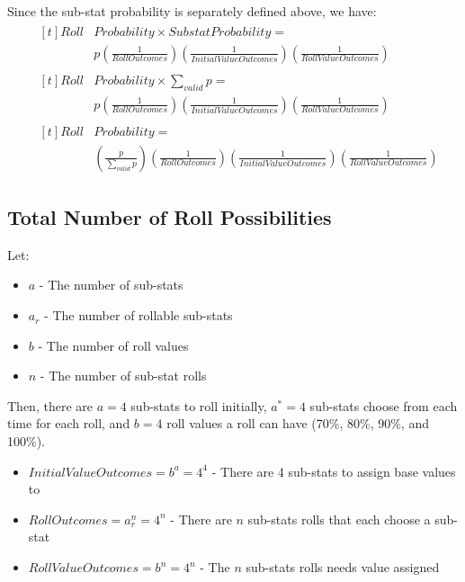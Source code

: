 \documentclass[12pt]{article}
\begin{document}
Since the sub-stat probability is separately defined above, we have:
\begin{align*}
	&\begin{aligned}[t]Roll&Probability \times SubstatProbability = \\
	&p\left(\frac{1}{RollOutcomes}\right)\left(\frac{1}{InitialValueOutcomes}\right)\left(\frac{1}{RollValueOutcomes}\right)\end{aligned} \\[12pt]
	&\begin{aligned}[t]Roll&Probability \times \sum_{valid} p = \\
	&p\left(\frac{1}{RollOutcomes}\right)\left(\frac{1}{InitialValueOutcomes}\right)\left(\frac{1}{RollValueOutcomes}\right)\end{aligned} \\[12pt]
	&\begin{aligned}[t]Roll&Probability = \\
	&\left(\frac{p}{\sum_{valid} p}\right)\left(\frac{1}{RollOutcomes}\right)\left(\frac{1}{InitialValueOutcomes}\right)\left(\frac{1}{RollValueOutcomes}\right)\end{aligned}
\end{align*}

\subsection{Total Number of Roll Possibilities}

Let:
\begin{itemize}[]
	\item $a$ - The number of sub-stats
	\item $a_{r}$ - The number of rollable sub-stats
	\item $b$ - The number of roll values
	\item $n$ - The number of sub-stat rolls
\end{itemize}

Then, there are $a = 4$ sub-stats to roll initially, $a^* = 4$ sub-stats choose from each time for each roll, and $b = 4$ roll values a roll can have (70\%, 80\%, 90\%, and 100\%).
\begin{itemize}[]
	\item $InitialValueOutcomes = b^a = 4^4$ - There are 4 sub-stats to assign base values to
	\item $RollOutcomes = a_{r}^n = 4^n$ - There are $n$ sub-stats rolls that each choose a sub-stat
	\item $RollValueOutcomes = b^n = 4^n$ - The $n$ sub-stats rolls needs value assigned
\end{itemize}
\end{document}
